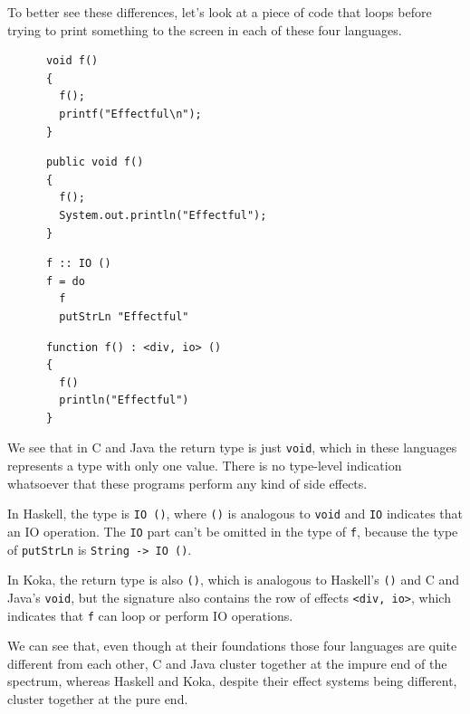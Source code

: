 \documentclass[declaration,inz,english,shortabstract]{iithesis}
\newcommand{\m}[1]{\texttt{#1}}
\begin{document}
To better see these differences, let's look at a piece of code that loops before trying to print something to the screen in each of these four languages.

\begin{listing}[H]
  \begin{verbatim}
      void f()
      {
        f();
        printf("Effectful\n");
      }
  \end{verbatim}
  \caption{C}
\end{listing}

\begin{listing}[H]
  \begin{verbatim}
      public void f()
      {
        f();
        System.out.println("Effectful");
      }
  \end{verbatim}
  \caption{Java}
\end{listing}

\begin{listing}[H]
  \begin{verbatim}
      f :: IO ()
      f = do
        f
        putStrLn "Effectful"
  \end{verbatim}
  \caption{Haskell}
\end{listing}

\begin{listing}[H]
  \begin{verbatim}
      function f() : <div, io> ()
      {
        f()
        println("Effectful")
      }
  \end{verbatim}
  \caption{Koka}
\end{listing}

We see that in C and Java the return type is just \m{void}, which in these languages represents a type with only one value. There is no type-level indication whatsoever that these programs perform any kind of side effects.

In Haskell, the type is \m{IO ()}, where \m{()} is analogous to \m{void} and \m{IO} indicates that an IO operation. The \m{IO} part can't be omitted in the type of \m{f}, because the type of \m{putStrLn} is \m{String -> IO ()}.

In Koka, the return type is also \m{()}, which is analogous to Haskell's \m{()} and C and Java's \m{void}, but the signature also contains the row of effects \m{<div, io>}, which indicates that \m{f} can loop or perform IO operations.

We can see that, even though at their foundations those four languages are quite different from each other, C and Java cluster together at the impure end of the spectrum, whereas Haskell and Koka, despite their effect systems being different, cluster together at the pure end.
\end{document}
